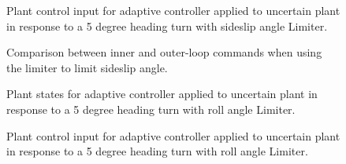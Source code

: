 \newpage
\begin{figure}[H]
  \hspace{-0.5in}
  \noindent{}
  \vspace{-1.0in}
  \caption{Plant control input for adaptive controller applied to uncertain plant in response to a 5 degree heading turn with sideslip angle Limiter.\label{fig.stateLimiterControl}}
\end{figure}

\newpage
\begin{figure}[H]
  \hspace{-0.5in}
  \noindent{}
  \vspace{-1.0in}
  \caption{Comparison between inner and outer-loop commands when using the limiter to limit sideslip angle.\label{fig.comparison}}
\end{figure}

\newpage
\begin{figure}[H]
  \hspace{-0.5in}
  \noindent{}
  \vspace{-1.0in}
  \caption{Plant states for adaptive controller applied to uncertain plant in response to a 5 degree heading turn with roll angle Limiter.\label{fig.stateLimiterRollAngleState}}
\end{figure}

\newpage
\begin{figure}[H]
  \hspace{-0.5in}
  \noindent{}
  \vspace{-1.0in}
  \caption{Plant control input for adaptive controller applied to uncertain plant in response to a 5 degree heading turn with roll angle Limiter.\label{fig.stateLimiterRollAngleControl}}
\end{figure}
